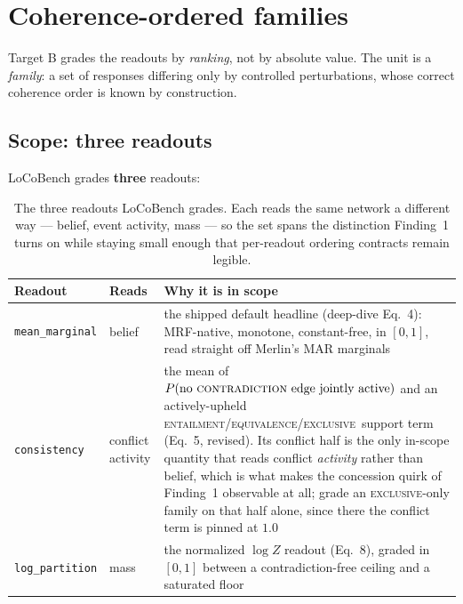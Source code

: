 \documentclass[11pt]{article}
\newcommand{\cEnt}{\textsc{entailment}}
\newcommand{\cCon}{\textsc{contradiction}}
\newcommand{\cEqv}{\textsc{equivalence}}
\newcommand{\cExc}{\textsc{exclusive}}
\newcommand{\readout}[1]{\texttt{#1}}
\begin{document}
\section{Coherence-ordered families}
\label{sec:families}

Target B grades the readouts by \emph{ranking}, not by absolute value. The unit is a
\emph{family}: a set of responses differing only by controlled perturbations, whose correct
coherence order is known by construction.

\subsection{Scope: three readouts}
\label{sec:scope}

LoCoBench grades \textbf{three} readouts:

\begin{table}[h]\centering\small
\renewcommand{\arraystretch}{1.15}
\begin{tabular}{@{}llp{7.7cm}@{}}
\toprule
\textbf{Readout} & \textbf{Reads} & \textbf{Why it is in scope}\\
\midrule
\readout{mean\_marginal} & belief &
  the shipped default headline (deep-dive Eq.~4): MRF-native, monotone, constant-free, in
  $[0,1]$, read straight off Merlin's MAR marginals\\
\readout{consistency}    & conflict activity &
  the mean of $P(\text{no \cCon\ edge jointly active})$ and an actively-upheld
  \cEnt/\cEqv/\cExc\ support term (Eq.~5, revised). Its conflict half is the only in-scope
  quantity that reads conflict \emph{activity} rather than belief, which is what makes the
  concession quirk of Finding~1 observable at all; grade an \cExc-only family on that half
  alone, since there the conflict term is pinned at $1.0$\\
\readout{log\_partition} & mass &
  the normalized $\log Z$ readout (Eq.~8), graded in $[0,1]$ between a contradiction-free
  ceiling and a saturated floor\\
\bottomrule
\end{tabular}
\caption{The three readouts LoCoBench grades. Each reads the same network a different way ---
belief, event activity, mass --- so the set spans the distinction Finding~1 turns on while
staying small enough that per-readout ordering contracts remain legible.}
\label{tab:scope}
\end{table}
\end{document}
